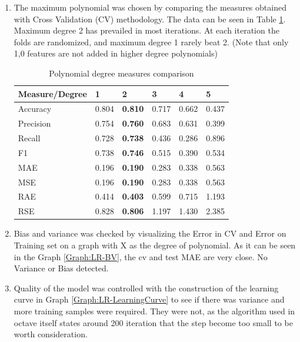 \documentclass{article}
\begin{document}
\begin{enumerate}  
\item The maximum polynomial was chosen by comparing the measures obtained with Cross Validation (CV) methodology. The data can be seen in Table
\ref{tab:LR-Measures}. Maximum degree 2 has prevailed in most iterations. At each iteration the folds are randomized, and maximum degree 1 rarely beat 2. (Note that only 1,0 features are not added in higher degree polynomials)

\begin{table}[]
\centering
\caption{Polynomial degree measures comparison}
\label{tab:LR-Measures}
\begin{tabular}{|l|l|l|l|l|l|}
\hline
Measure/Degree  & 1     & \textbf{2}     & 3     & 4     & 5     \\ \hline
Accuracy  		& 0.804 & \textbf{0.810} & 0.717 & 0.662 & 0.437 \\ \hline
Precision		& 0.754 & \textbf{0.760} & 0.683 & 0.631 & 0.399 \\ \hline
Recall    		& 0.728 & \textbf{0.738} & 0.436 & 0.286 & 0.896 \\ \hline
F1        		& 0.738 & \textbf{0.746} & 0.515 & 0.390 & 0.534 \\ \hline
MAE       		& 0.196 & \textbf{0.190} & 0.283 & 0.338 & 0.563 \\ \hline
MSE       		& 0.196 & \textbf{0.190} & 0.283 & 0.338 & 0.563 \\ \hline
RAE       		& 0.414 & \textbf{0.403} & 0.599 & 0.715 & 1.193 \\ \hline
RSE       		& 0.828 & \textbf{0.806} & 1.197 & 1.430 & 2.385 \\ \hline
\end{tabular}
\end{table}

\item Bias and variance was checked by visualizing the Error in CV and Error on Training set on a graph with X as the degree of polynomial. As it can be seen in the Graph \ref{Graph:LR-BV}, the cv and test MAE are very close. No Variance or Bias detected. 


\item Quality of the model was controlled with the construction of the learning curve in Graph \ref{Graph:LR-LearningCurve} to see if there was variance and more training samples were required. They were not, as the algorithm used in octave itself states around 200 iteration that the step become too small to be worth consideration.
\end{enumerate}
\end{document}

